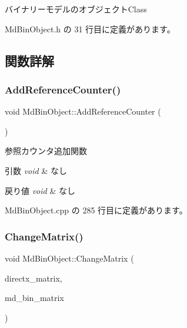 バイナリーモデルのオブジェクト\+Class 

 Md\+Bin\+Object.\+h の 31 行目に定義があります。



\subsection{関数詳解}
\mbox{\label{class_md_bin_object_a0b4b71f40a5e6f4c83f2f0232187801e}} 
\subsubsection{\texorpdfstring{Add\+Reference\+Counter()}{AddReferenceCounter()}}
{\footnotesize\ttfamily void Md\+Bin\+Object\+::\+Add\+Reference\+Counter (\begin{DoxyParamCaption}{ }\end{DoxyParamCaption})}



参照カウンタ追加関数 


\begin{DoxyParams}{引数}
{\em void} & なし \\
\hline
\end{DoxyParams}

\begin{DoxyRetVals}{戻り値}
{\em void} & なし \\
\hline
\end{DoxyRetVals}


 Md\+Bin\+Object.\+cpp の 285 行目に定義があります。

\mbox{\label{class_md_bin_object_a59d4f0131952b4efbd169275a3aae7e3}} 
\subsubsection{\texorpdfstring{Change\+Matrix()}{ChangeMatrix()}}
{\footnotesize\ttfamily void Md\+Bin\+Object\+::\+Change\+Matrix (\begin{DoxyParamCaption}\item[{\mbox{\hyperlink{_matrix_8h_a032295cd9fb1b711757c90667278e744}{M\+A\+T\+R\+IX}} $\ast$}]{directx\+\_\+matrix,  }\item[{\mbox{\hyperlink{class_md_bin_data_1_1_matrix}{Md\+Bin\+Data\+::\+Matrix}} $\ast$}]{md\+\_\+bin\+\_\+matrix }\end{DoxyParamCaption})\hspace{0.3cm}{\ttfamily [private]}}



